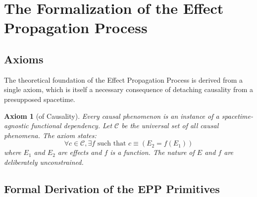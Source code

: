 
\newtheorem{definition}{Definition}[section]
\newtheorem{axiom}{Axiom}


\section{The Formalization of the Effect Propagation Process}
\label{sec:formalization}

\subsection{Axioms}
\label{sec:formalization_axioms}

The theoretical foundation of the Effect Propagation Process is derived from a single axiom, which is itself a necessary consequence of detaching causality from a presupposed spacetime.

\begin{axiom}[of Causality]
Every causal phenomenon is an instance of a spacetime-agnostic functional dependency. Let $\mathcal{C}$ be the universal set of all causal phenomena. The axiom states:
\begin{equation}
\forall c \in \mathcal{C}, \exists f \text{ such that } c \equiv (E_2 = f(E_1))
\end{equation}
where $E_1$ and $E_2$ are effects and $f$ is a function. The nature of $E$ and $f$ are deliberately unconstrained.
\end{axiom}

\subsection{Formal Derivation of the EPP Primitives}
\label{sec:formalization_derivation}

